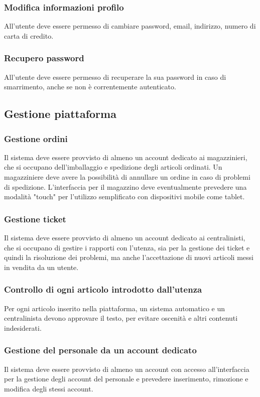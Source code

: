 \documentclass[12pt,a4paper]{article}
\begin{document}
\subsubsection{Modifica informazioni profilo}
All'utente deve essere permesso di cambiare password, email, indirizzo, numero di carta di credito.

\subsubsection{Recupero password}
All'utente deve essere permesso di recuperare la sua password in caso di smarrimento, anche se non è correntemente autenticato.

\subsection{Gestione piattaforma}

\subsubsection{Gestione ordini}
Il sistema deve essere provvisto di almeno un account dedicato ai magazzinieri, che si occupano dell'imballaggio e spedizione degli articoli ordinati. Un magazziniere deve avere la possibilità di annullare un ordine in caso di problemi di spedizione. L'interfaccia per il magazzino deve eventualmente prevedere una modalità "touch" per l'utilizzo semplificato con dispositivi mobile come tablet.

\subsubsection{Gestione ticket}
Il sistema deve essere provvisto di almeno un account dedicato ai centralinisti, che si occupano di gestire i rapporti con l'utenza, sia per la gestione dei ticket e quindi la risoluzione dei problemi, ma anche l'accettazione di nuovi articoli messi in vendita da un utente.

\subsubsection{Controllo di ogni articolo introdotto dall'utenza}
Per ogni articolo inserito nella piattaforma, un sistema automatico e un centralinista devono approvare il testo, per evitare oscenità e altri contenuti indesiderati.

\subsubsection{Gestione del personale da un account dedicato}
Il sistema deve essere provvisto di almeno un account con accesso all'interfaccia per la gestione degli account del personale e prevedere inserimento, rimozione e modifica degli stessi account.
\end{document}
